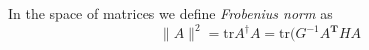 \begin{definition}
\label{definition-Frobenius-norm}
In the space of matrices we define {\it
Frobenius norm} as
\begin{equation}
\label{equation-Frobenius-norm}
\|A\|^2=\text{tr}A^\dag
A=\text{tr}(G^{-1}A^{\mathbf{T}}HA
\end{equation}
\end{definition}





